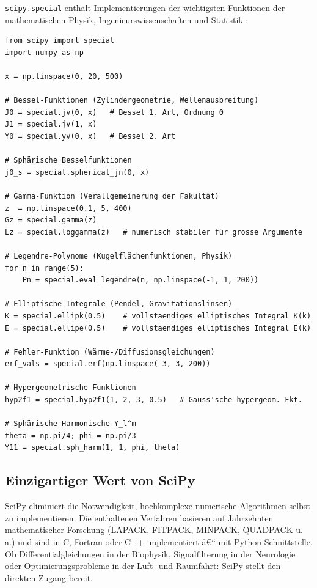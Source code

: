 \documentclass[12pt, a4paper]{article}
\begin{document}
\texttt{scipy.special} enthält Implementierungen der wichtigsten
Funktionen der mathematischen Physik, Ingenieurswissenschaften und
Statistik \cite{abramowitz1972handbook}:

\begin{lstlisting}[caption={Spezielle Funktionen mit SciPy}]
from scipy import special
import numpy as np

x = np.linspace(0, 20, 500)

# Bessel-Funktionen (Zylindergeometrie, Wellenausbreitung)
J0 = special.jv(0, x)   # Bessel 1. Art, Ordnung 0
J1 = special.jv(1, x)
Y0 = special.yv(0, x)   # Bessel 2. Art

# Sphärische Besselfunktionen
j0_s = special.spherical_jn(0, x)

# Gamma-Funktion (Verallgemeinerung der Fakultät)
z  = np.linspace(0.1, 5, 400)
Gz = special.gamma(z)
Lz = special.loggamma(z)   # numerisch stabiler für grosse Argumente

# Legendre-Polynome (Kugelflächenfunktionen, Physik)
for n in range(5):
    Pn = special.eval_legendre(n, np.linspace(-1, 1, 200))

# Elliptische Integrale (Pendel, Gravitationslinsen)
K = special.ellipk(0.5)    # vollstaendiges elliptisches Integral K(k)
E = special.ellipe(0.5)    # vollstaendiges elliptisches Integral E(k)

# Fehler-Funktion (Wärme-/Diffusionsgleichungen)
erf_vals = special.erf(np.linspace(-3, 3, 200))

# Hypergeometrische Funktionen
hyp2f1 = special.hyp2f1(1, 2, 3, 0.5)   # Gauss'sche hypergeom. Fkt.

# Sphärische Harmonische Y_l^m
theta = np.pi/4; phi = np.pi/3
Y11 = special.sph_harm(1, 1, phi, theta)
\end{lstlisting}

\subsection{Einzigartiger Wert von SciPy}

SciPy eliminiert die Notwendigkeit, hochkomplexe numerische Algorithmen
selbst zu implementieren. Die enthaltenen Verfahren basieren auf Jahrzehnten
mathematischer Forschung (LAPACK, FITPACK, MINPACK, QUADPACK u.\,a.) und
sind in C, Fortran oder C++ implementiert â€“ mit Python-Schnittstelle.
Ob Differentialgleichungen in der Biophysik, Signalfilterung in der
Neurologie oder Optimierungsprobleme in der Luft- und Raumfahrt:
SciPy stellt den direkten Zugang bereit.
\end{document}

